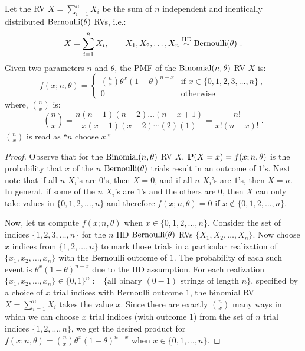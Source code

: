 \begin{model}
Let the RV $X=\sum_{i=1}^n X_i$ be the sum of $n$ independent and identically distributed $\mbox{{\rm Bernoulli}}(\theta)$ RVs, i.e.:
\[
X=\sum_{i=1}^n X_i, \qquad X_1,X_2,\ldots,X_n \overset{{\rm IID}}{\sim} \mbox{{\rm Bernoulli}}(\theta) \ .
\]
Given two parameters $n$ and $\theta$, the PMF of the $\mbox{{\rm Binomial}}(n,\theta)$ RV $X$ is:
\begin{equation}
 f(x; n,\theta) =
 \begin{cases}
 \displaystyle\binom{n}{x} \theta^x (1-\theta)^{n-x} & \text{if $x \in \{0,1,2,3,\ldots,n\}$} \ ,\\
 0 & \text{otherwise}
 \end{cases}
 \end{equation}
where, $\binom{n}{x}$ is:
\[
\binom{n}{x} = \frac{n(n-1)(n-2)\ldots(n-x+1)}{x(x-1)(x-2)\cdots (2)(1)} =  \frac{n !}{x! (n-x)!} \ .
 \]
$\binom{n}{x}$ is read as ``$n$ choose $x$.''
 \end{model}
\begin{proof}
Observe that for the $\mbox{{\rm Binomial}}(n,\theta)$ RV $X$, $\mathbf{P}(X=x) = f(x;n,\theta)$ is the probability that $x$ of the $n$ $\mbox{{\rm Bernoulli}}(\theta)$ trials result in an outcome of $1$'s.  Next note that if all $n$ $X_i$'s are $0$'s, then $X=0$, and if all $n$ $X_i$'s are $1$'s, then $X=n$.  In general, if some of the $n$ $X_i$'s are $1$'s and the others are $0$, then $X$ can only take values in $\{0,1,2,\ldots,n\}$ and therefore $f(x;n,\theta)=0$ if $x \notin \{0,1,2,\ldots,n\}$.

Now, let us compute $f(x;n,\theta)$ when $x\in\{0,1,2,\ldots,n\}$.  Consider the set of indices $\{1,2,3,\ldots,n\}$ for the $n$ IID $\mbox{{\rm Bernoulli}}(\theta)$ RVs $\{X_1,X_2,\ldots,X_n\}$.  Now choose $x$ indices from $\{1,2,\ldots,n\}$ to mark those trials in a particular realization of $\{x_1,x_2,\ldots,x_n\}$ with the Bernoulli outcome of $1$.  The probability of each such event is $\theta^x (1-\theta)^{n-x}$ due to the IID assumption.  For each realization $\{x_1,x_2,\ldots,x_n\} \in \{0,1\}^{n} := \{ \text{all binary $(0-1)$ strings of length $n$}\}$, specified by a choice of $x$ trial indices with Bernoulli outcome $1$, the binomial RV $X=\sum_{i=1}^n X_i$ takes the value $x$.  Since there are exactly $\binom{n}{x}$ many ways in which we can choose $x$ trial indices (with outcome $1$) from the set of $n$ trial indices $\{1,2,\ldots,n\}$, we get the desired product for $f(x; n,\theta) = \binom{n}{x} \theta^x (1-\theta)^{n-x}$ when $x \in \{0,1,\ldots,n\}$.
\end{proof}
